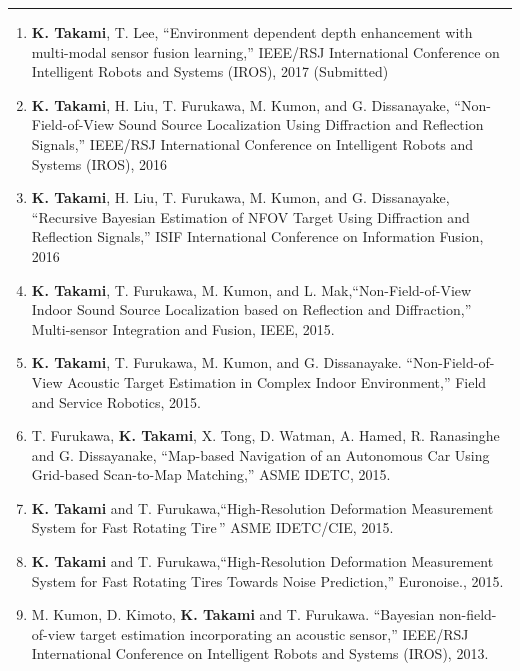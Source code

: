 \documentclass[11pt,letterpaper]{article}
\newcommand{\sect}[1]{\vspace{2mm}{\centering {\bf \large \scshape \uppercase{#1}} \par}  {\color{blue} \vskip 2mm \hrule height 1pt}\vspace{2mm}}
\begin{document}
\sect{Selected Conference papers and workshop}
\begin{enumerate}
	\item {\bf K. Takami}, T. Lee, ``Environment dependent depth enhancement with multi-modal sensor fusion learning,'' IEEE/RSJ International Conference on Intelligent Robots and Systems (IROS), 2017 (Submitted)
	\item {\bf K. Takami}, H. Liu, T. Furukawa, M. Kumon, and G. Dissanayake, ``Non-Field-of-View Sound Source Localization	Using Diffraction and Reflection Signals,'' IEEE/RSJ International Conference on Intelligent Robots and Systems (IROS), 2016
  \item {\bf K. Takami}, H. Liu, T. Furukawa, M. Kumon, and G. Dissanayake, ``Recursive Bayesian Estimation of NFOV Target Using Diffraction and Reflection Signals,'' ISIF International Conference on Information Fusion, 2016
  \item  {\bf K. Takami}, T. Furukawa, M. Kumon, and L. Mak,``Non-Field-of-View Indoor Sound Source Localization based on Reflection and Diffraction,'' Multi-sensor Integration and Fusion, IEEE, 2015.
  \item {\bf K. Takami}, T. Furukawa, M. Kumon, and G. Dissanayake. ``Non-Field-of-View Acoustic Target Estimation in Complex Indoor Environment,'' Field and Service Robotics, 2015.
  \item  T. Furukawa, {\bf K. Takami}, X. Tong, D. Watman, A. Hamed, R. Ranasinghe and G. Dissayanake, ``Map-based Navigation of an Autonomous Car Using Grid-based Scan-to-Map Matching,'' ASME IDETC, 2015.
  \item  {\bf K. Takami} and T. Furukawa,``High-Resolution Deformation Measurement System for Fast Rotating Tire\,'' ASME IDETC/CIE, 2015.


  \item  {\bf K. Takami} and T. Furukawa,``High-Resolution Deformation Measurement System for Fast Rotating Tires Towards Noise Prediction,'' Euronoise., 2015.
  \iftoggle{resume}{}{
  \item M. Kumon, D. Kimoto, {\bf K. Takami} and T. Furukawa, ``Acoustic recursive Bayesian estimation for non-field-of-view targets,'' In Image Analysis for Multimedia Interactive Services (WIAMIS), IEEE, 2013.
}
  \item M. Kumon, D. Kimoto, {\bf K. Takami} and T. Furukawa. ``Bayesian non-field-of-view target estimation incorporating an acoustic sensor,'' IEEE/RSJ International Conference on Intelligent Robots and Systems  (IROS), 2013.
  \iftoggle{resume}{}{

  \item {\bf K. Takami}, S. Taheri, M. Taheri and T. Furukawa, ``Prediction of Railroad Track Foundation Defects Using Wavelets,'' Joint Rail Conference, ASME, 2013.
  }
\end{enumerate}
\end{document}
